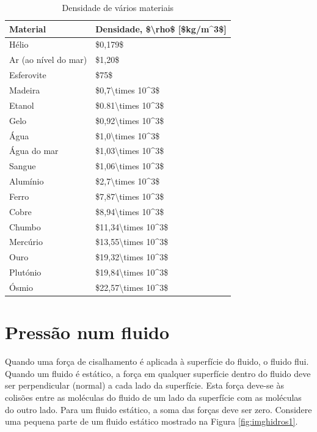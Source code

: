 \documentclass[
  portuguese,
  ]{book}
\begin{document}
\begin{table}

\caption{\label{tab:unnamed-chunk-4}Densidade de vários materiais}
\centering
\begin{tabular}[t]{l|l}
\hline
Material & Densidade, \$\textbackslash{}rho\$ [\$kg/m\textasciicircum{}3\$]\\
\hline
Hélio & \$0,179\$\\
\hline
Ar (ao nível do mar) & \$1,20\$\\
\hline
Esferovite & \$75\$\\
\hline
Madeira & \$0,7\textbackslash{}times 10\textasciicircum{}3\$\\
\hline
Etanol & \$0.81\textbackslash{}times 10\textasciicircum{}3\$\\
\hline
Gelo & \$0,92\textbackslash{}times 10\textasciicircum{}3\$\\
\hline
Água & \$1,0\textbackslash{}times 10\textasciicircum{}3\$\\
\hline
Água do mar & \$1,03\textbackslash{}times 10\textasciicircum{}3\$\\
\hline
Sangue & \$1,06\textbackslash{}times 10\textasciicircum{}3\$\\
\hline
Alumínio & \$2,7\textbackslash{}times 10\textasciicircum{}3\$\\
\hline
Ferro & \$7,87\textbackslash{}times 10\textasciicircum{}3\$\\
\hline
Cobre & \$8,94\textbackslash{}times 10\textasciicircum{}3\$\\
\hline
Chumbo & \$11,34\textbackslash{}times 10\textasciicircum{}3\$\\
\hline
Mercúrio & \$13,55\textbackslash{}times 10\textasciicircum{}3\$\\
\hline
Ouro & \$19,32\textbackslash{}times 10\textasciicircum{}3\$\\
\hline
Plutónio & \$19,84\textbackslash{}times 10\textasciicircum{}3\$\\
\hline
Ósmio & \$22,57\textbackslash{}times 10\textasciicircum{}3\$\\
\hline
\end{tabular}
\end{table}

\hypertarget{pressuxe3o-num-fluido}{%
\section{Pressão num fluido}\label{pressuxe3o-num-fluido}}

Quando uma força de cisalhamento é aplicada à superfície do fluido, o fluido flui. Quando um fluido é estático, a força em qualquer superfície dentro do fluido deve ser perpendicular (normal) a cada lado da superfície. Esta força deve-se às colisões entre as moléculas do fluido de um lado da superfície com as moléculas do outro lado. Para um fluido estático, a soma das forças deve ser zero. Considere uma pequena parte de um fluido estático mostrado na Figura \ref{fig:imghidros1}.
\end{document}
